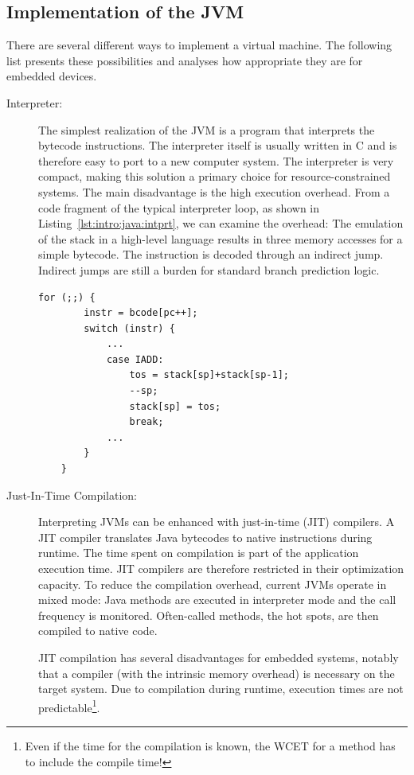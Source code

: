 \subsection{Implementation of the JVM}

There are several different ways to implement a virtual machine. The
following list presents these possibilities and analyses how
appropriate they are for embedded devices.
%
\begin{description}
    \item[Interpreter:]
The simplest realization of the JVM is a program that interprets the
bytecode instructions. The interpreter itself is usually written in
C and is therefore easy to port to a new computer system. The
interpreter is very compact, making this solution a primary choice
for resource-constrained systems. The main disadvantage is the high
execution overhead. From a code fragment of the typical interpreter
loop, as shown in Listing~\ref{lst:intro:java:intprt}, we can
examine the overhead: The emulation of the stack in a high-level
language results in three memory accesses for a simple 
bytecode. The instruction is decoded through an indirect jump.
Indirect jumps are still a burden for standard branch prediction
logic.

\begin{lstlisting}[float,caption={Typical JVM interpreter loop},
label=lst:intro:java:intprt]
    for (;;) {
        instr = bcode[pc++];
        switch (instr) {
            ...
            case IADD:
                tos = stack[sp]+stack[sp-1];
                --sp;
                stack[sp] = tos;
                break;
            ...
        }
    }
\end{lstlisting}

    \item[Just-In-Time Compilation:]
Interpreting JVMs can be enhanced with just-in-time (JIT) compilers.
A JIT compiler translates Java bytecodes to native instructions
during runtime. The time spent on compilation is part of the
application execution time. JIT compilers are therefore restricted
in their optimization capacity. To reduce the compilation overhead,
current JVMs operate in mixed mode: Java methods are executed in
interpreter mode and the call frequency is monitored. Often-called
methods, the hot spots, are then compiled to native code.

JIT compilation has several disadvantages for embedded systems,
notably that a compiler (with the intrinsic memory overhead) is
necessary on the target system. Due to compilation during runtime,
execution times are not predictable\footnote{Even if the time for
the compilation is known, the WCET for a method has to include the
compile time!}.


\end{description}
